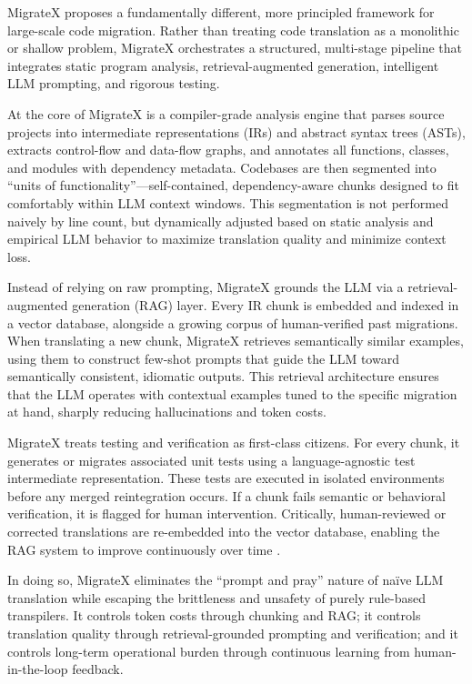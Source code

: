 \documentclass[twocolumn]{article}
\begin{document}
MigrateX proposes a fundamentally different, more principled framework for large-scale code migration. Rather than treating code translation as a monolithic or shallow problem, MigrateX orchestrates a structured, multi-stage pipeline that integrates static program analysis, retrieval-augmented generation, intelligent LLM prompting, and rigorous testing.

At the core of MigrateX is a compiler-grade analysis engine that parses source projects into intermediate representations (IRs) and abstract syntax trees (ASTs), extracts control-flow and data-flow graphs, and annotates all functions, classes, and modules with dependency metadata. Codebases are then segmented into ``units of functionality''---self-contained, dependency-aware chunks designed to fit comfortably within LLM context windows. This segmentation is not performed naively by line count, but dynamically adjusted based on static analysis and empirical LLM behavior to maximize translation quality and minimize context loss.

Instead of relying on raw prompting, MigrateX grounds the LLM via a retrieval-augmented generation (RAG) layer. Every IR chunk is embedded and indexed in a vector database, alongside a growing corpus of human-verified past migrations. When translating a new chunk, MigrateX retrieves semantically similar examples, using them to construct few-shot prompts that guide the LLM toward semantically consistent, idiomatic outputs. This retrieval architecture ensures that the LLM operates with contextual examples tuned to the specific migration at hand, sharply reducing hallucinations and token costs.

MigrateX treats testing and verification as first-class citizens. For every chunk, it generates or migrates associated unit tests using a language-agnostic test intermediate representation. These tests are executed in isolated environments before any merged reintegration occurs. If a chunk fails semantic or behavioral verification, it is flagged for human intervention. Critically, human-reviewed or corrected translations are re-embedded into the vector database, enabling the RAG system to improve continuously over time \cite{silva2023repairllama} \cite{bhattarai2024enhancing}.

In doing so, MigrateX eliminates the ``prompt and pray'' nature of naïve LLM translation while escaping the brittleness and unsafety of purely rule-based transpilers. It controls token costs through chunking and RAG; it controls translation quality through retrieval-grounded prompting and verification; and it controls long-term operational burden through continuous learning from human-in-the-loop feedback.
\end{document}
